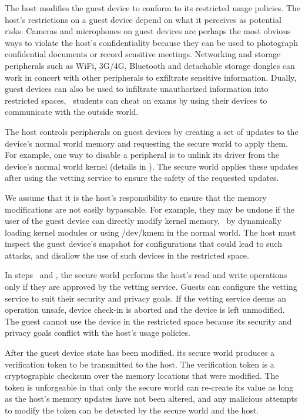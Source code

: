 \begin{mylist}
\item {} The host modifies the guest
device to conform to its restricted usage policies.  The host's restrictions on
a guest device depend on what it perceives as potential risks.  Cameras and
microphones on guest devices are perhaps the most obvious ways to violate the
host's confidentiality because they can be used to photograph confidential
documents or record sensitive meetings. Networking and storage peripherals such
as WiFi, 3G/4G, Bluetooth and detachable storage dongles can work in concert
with other peripherals to exfiltrate sensitive information. Dually, guest
devices can also be used to infiltrate unauthorized information into restricted
spaces, \eg~students can cheat on exams by using their devices to communicate
with the outside world.

The host controls peripherals on guest devices by creating a set of updates to
the device's normal world memory and requesting the secure world to apply them.
For example, one way to disable a peripheral is to unlink its driver from the
device's normal world kernel (details in ).  The secure
world applies these updates after using the vetting service to ensure the
safety of the requested updates.

We assume that it is the host's responsibility to ensure that the memory
modifications are not easily bypassable. For example, they may be undone if the
user of the guest device can directly modify kernel memory, \eg~by dynamically
loading kernel modules or using \textsf{/dev/kmem} in the normal world. The
host must inspect the guest device's snapshot for configurations that could
lead to such attacks, and disallow the use of such devices in the restricted
space.

In steps \circtwo\ and \circthree, the secure world performs the host's read
and write operations only if they are approved by the vetting service. Guests
can configure the vetting service to suit their security and privacy goals. If
the vetting service deems an operation unsafe, device check-in is aborted and
the device is left unmodified. The guest cannot use the device in the
restricted space because its security and privacy goals conflict with the
host's usage policies.

\item {} After the guest
device state has been modified, its secure world produces a verification token
to be transmitted to the host. The verification token is a cryptographic
checksum over the memory locations that were modified. The token is unforgeable
in that only the secure world can re-create its value as long as the host's
memory updates have not been altered, and any malicious attempts to modify the
token can be detected by the secure world and the host.


\end{mylist}
